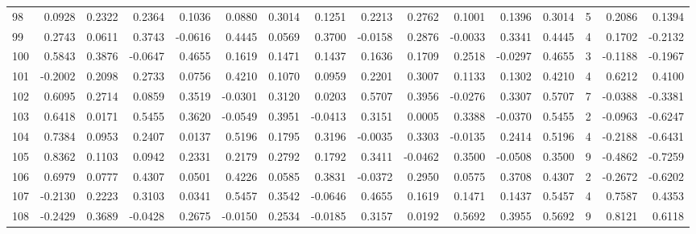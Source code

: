 \begin{tabular}{lrrrrrrrrrrrrrrr}
98  &      0.0928 &  0.2322 &  0.2364 &  0.1036 &  0.0880 &  0.3014 &  0.1251 &  0.2213 &  0.2762 &  0.1001 &   0.1396 &     0.3014 &      5 &                    0.2086 &                     0.1394 \\
99  &      0.2743 &  0.0611 &  0.3743 & -0.0616 &  0.4445 &  0.0569 &  0.3700 & -0.0158 &  0.2876 & -0.0033 &   0.3341 &     0.4445 &      4 &                    0.1702 &                    -0.2132 \\
100 &      0.5843 &  0.3876 & -0.0647 &  0.4655 &  0.1619 &  0.1471 &  0.1437 &  0.1636 &  0.1709 &  0.2518 &  -0.0297 &     0.4655 &      3 &                   -0.1188 &                    -0.1967 \\
101 &     -0.2002 &  0.2098 &  0.2733 &  0.0756 &  0.4210 &  0.1070 &  0.0959 &  0.2201 &  0.3007 &  0.1133 &   0.1302 &     0.4210 &      4 &                    0.6212 &                     0.4100 \\
102 &      0.6095 &  0.2714 &  0.0859 &  0.3519 & -0.0301 &  0.3120 &  0.0203 &  0.5707 &  0.3956 & -0.0276 &   0.3307 &     0.5707 &      7 &                   -0.0388 &                    -0.3381 \\
103 &      0.6418 &  0.0171 &  0.5455 &  0.3620 & -0.0549 &  0.3951 & -0.0413 &  0.3151 &  0.0005 &  0.3388 &  -0.0370 &     0.5455 &      2 &                   -0.0963 &                    -0.6247 \\
104 &      0.7384 &  0.0953 &  0.2407 &  0.0137 &  0.5196 &  0.1795 &  0.3196 & -0.0035 &  0.3303 & -0.0135 &   0.2414 &     0.5196 &      4 &                   -0.2188 &                    -0.6431 \\
105 &      0.8362 &  0.1103 &  0.0942 &  0.2331 &  0.2179 &  0.2792 &  0.1792 &  0.3411 & -0.0462 &  0.3500 &  -0.0508 &     0.3500 &      9 &                   -0.4862 &                    -0.7259 \\
106 &      0.6979 &  0.0777 &  0.4307 &  0.0501 &  0.4226 &  0.0585 &  0.3831 & -0.0372 &  0.2950 &  0.0575 &   0.3708 &     0.4307 &      2 &                   -0.2672 &                    -0.6202 \\
107 &     -0.2130 &  0.2223 &  0.3103 &  0.0341 &  0.5457 &  0.3542 & -0.0646 &  0.4655 &  0.1619 &  0.1471 &   0.1437 &     0.5457 &      4 &                    0.7587 &                     0.4353 \\
108 &     -0.2429 &  0.3689 & -0.0428 &  0.2675 & -0.0150 &  0.2534 & -0.0185 &  0.3157 &  0.0192 &  0.5692 &   0.3955 &     0.5692 &      9 &                    0.8121 &                     0.6118 \\

\end{tabular}

